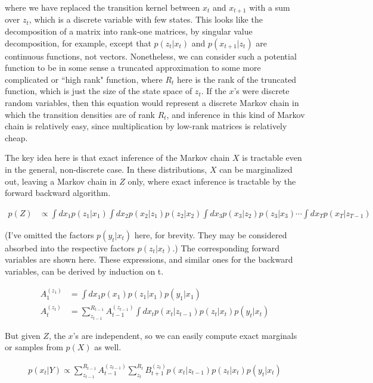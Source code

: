 \documentclass[11pt]{article}
\begin{document}
\noindent where we have replaced the transition kernel between $x_t$ and $x_{t+1}$ with a sum over $z_t$, which is a discrete variable with few states. This looks like the decomposition of a matrix into rank-one matrices, by singular value decomposition, for example, except that $p(z_t | x_t)$ and $p(x_{t+1} | z_t)$ are continuous functions, not vectors. Nonetheless, we can consider such a potential function to be in some sense a truncated approximation to some more complicated or ``high rank" function, where $R_t$ here is the rank of the truncated function, which is just the size of the state space of $z_t$. If the $x$'s were discrete random variables, then this equation would represent a discrete Markov chain in which the transition densities are of rank $R_t$, and inference in this kind of Markov chain is relatively easy, since multiplication by low-rank matrices is relatively cheap.

The key idea here is that exact inference of the Markov chain $X$ is tractable even in the general, non-discrete case. In these distributions, $X$ can be marginalized out, leaving a Markov chain in $Z$ only, where exact inference is tractable by the forward backward algorithm.

\begin{align*}
p(Z) &\propto \int dx_1 p(z_1|x_1) \int dx_2 p(x_2|z_1) p(z_2|x_2) \int dx_3 p(x_3|z_2) p(z_3|x_3) \cdots \int dx_T p(x_T|z_{T-1})
\end{align*}

\noindent (I've omitted the factors $p(y_t|x_t)$ here, for brevity. They may be considered absorbed into the respective factors $p(z_t|x_t)$.) The corresponding forward variables are shown here. These expressions, and similar ones for the backward variables, can be derived by induction on t.

\begin{align*}
A_1^{(z_1)} &= \int dx_1 p(x_1) p(z_1|x_1) p(y_1|x_1)\\
A_t^{(z_t)} &= \sum_{z_{t-1}}^{R_{t-1}} A_{t-1}^{(z_{t-1})} \int dx_t p(x_t|z_{t-1}) p(z_t|x_t) p(y_t|x_t)
\end{align*}

\noindent But given $Z$, the $x$'s are independent, so we can easily compute exact marginals or samples from $p(X)$ as well.

\begin{align*}
p(x_t|Y) \propto \sum_{z_{t-1}}^{R_{t-1}} A_{t-1}^{(z_{t-1})} \sum_{z_t}^{R_t} B_{t+1}^{(z_t)} p(x_t|z_{t-1}) p(z_t|x_t) p(y_t|x_t)
\end{align*}
\end{document}
